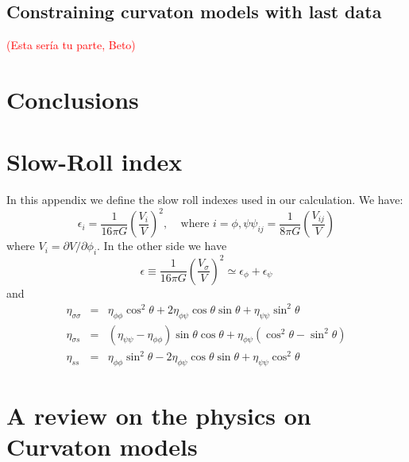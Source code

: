 \documentclass[amssymb,twocolumn,prd,nofootinbib,showpacs]{revtex4-1}
\begin{document}
\subsection{Constraining curvaton models with last data}
\textcolor{red}{(Esta ser\'ia tu parte, Beto)}
\section{Conclusions}\label{conclusions}
\appendix
\section{Slow-Roll index}

In this appendix we define the slow roll indexes used in our calculation. We have:
\begin{subequations}
\begin{equation}
\epsilon_i = \frac{1}{16 \pi G}\left(\frac{V_i}{V}\right)^2, \ \ \ \ \ \text{where $i=\phi,\psi$}
\end{equation}
\begin{equation}
\psi_{ij}=\frac{1}{8\pi G}\left(\frac{V_{ij}}{V}\right)
\end{equation}
\end{subequations}
where $V_i = \partial V/\partial \phi_i$. In the other side we have
\begin{equation}
\epsilon \equiv \frac{1}{16\pi G}\left(\frac{V_\sigma}{V}\right)^2\simeq \epsilon_\phi+\epsilon_\psi
\end{equation}
and
\begin{eqnarray}
\eta_{\sigma\sigma}&=&\eta_{\phi\phi}\cos^2\theta + 2\eta_{\phi\psi}\cos\theta\sin\theta+\eta_{\psi\psi}\sin^2\theta\nonumber \\
\eta_{\sigma s}&=&(\eta_{\psi\psi}-\eta_{\phi\phi})\sin\theta\cos\theta + \eta_{\phi\psi}(\cos^2\theta-\sin^2\theta)\\
\eta_{ss}&=&\eta_{\phi\phi}\sin^2\theta - 2\eta_{\phi\psi}\cos\theta\sin\theta+\eta_{\psi\psi}\cos^2\theta\nonumber 
\end{eqnarray}
\section{A review on the physics on Curvaton models}
\end{document}
